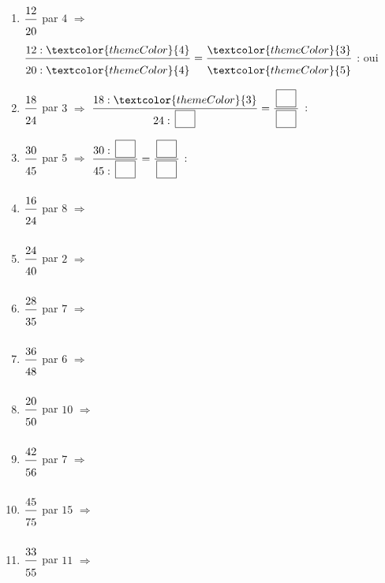 \begin{enumerate}[leftmargin=*,align=parleft, label=\alph*), itemsep=9pt]
\item $\FA{12}{20}$ par $4$ \quad $\Longrightarrow$ \quad $\FA{12 : \textcolor{themeColor}{4}}{20 : \textcolor{themeColor}{4}}=\FA{\textcolor{themeColor}{3}}{\textcolor{themeColor}{5}}$ \quad : \quad \textcolor{themeColor}{oui}
\item $\FA{18}{24}$ par $3$ \quad $\Longrightarrow$ \quad $\FA{18 : \textcolor{themeColor}{3}}{24 : \CaseC}=\FA{\CaseC}{\CaseC}$ \quad : \quad \Case
\item $\FA{30}{45}$ par $5$ \quad $\Longrightarrow$ \quad $\FA{30 : \CaseC}{45 : \CaseC}=\FA{\CaseC}{\CaseC}$ \quad : \quad \Case
\item $\FA{16}{24}$ par $8$ \quad $\Longrightarrow$
\item $\FA{24}{40}$ par $2$ \quad $\Longrightarrow$
\item $\FA{28}{35}$ par $7$ \quad $\Longrightarrow$
\item $\FA{36}{48}$ par $6$ \quad $\Longrightarrow$
\item $\FA{20}{50}$ par $10$ \quad $\Longrightarrow$
\item $\FA{42}{56}$ par $7$ \quad $\Longrightarrow$
\item $\FA{45}{75}$ par $15$ \quad $\Longrightarrow$
\item $\FA{33}{55}$ par $11$ \quad $\Longrightarrow$
\end{enumerate}
 
\newpage
{}
 
